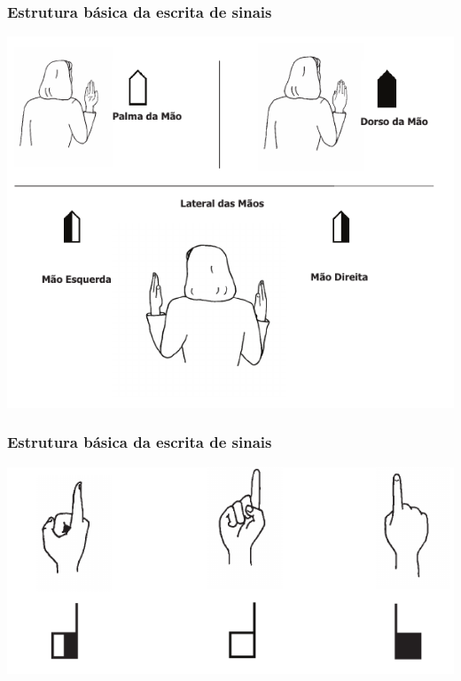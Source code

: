 \documentclass[10pt]{beamer}
\theoremstyle{plain}
\theoremstyle{definition}
\begin{document}
	\begin{frame}
		\frametitle{Estrutura básica da escrita de sinais}
		\begin{center}
			\includegraphics[scale=0.54]{figures/basico3.png}
		\end{center}
	\end{frame}

	\begin{frame}
		\frametitle{Estrutura básica da escrita de sinais}
		\begin{center}
			\includegraphics[scale=0.54]{figures/basico3-1.png}
		\end{center}
	\end{frame}
\end{document}
